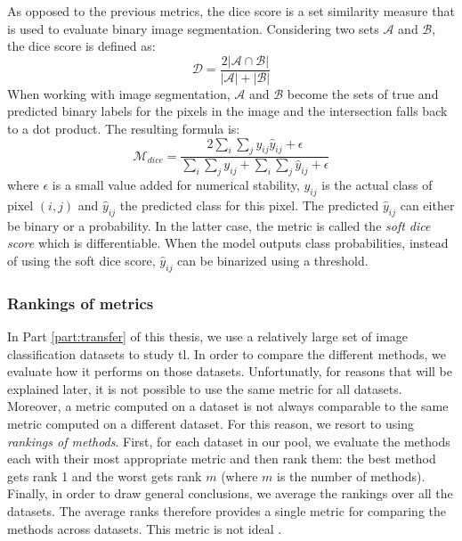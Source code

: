 As opposed to the previous metrics, the dice score is a set similarity measure that is used to evaluate binary image segmentation. Considering two sets $\mathcal{A}$ and $\mathcal{B}$, the dice score is defined as:
\begin{equation}
\label{eqn:backml:diceAB}
\mathcal{D} = \frac{2 \left|\mathcal{A}\cap \mathcal{B}\right|}{\left|\mathcal{A}\right| + \left|\mathcal{B}\right|}
\end{equation}
When working with image segmentation, $\mathcal{A}$ and $\mathcal{B}$ become the sets of true and predicted binary labels for the pixels in the image and the intersection falls back to a dot product. The resulting formula is:
\begin{equation}
\label{eqn:backml:dice}
\mathcal{M}_{dice} = \dfrac{2 \sum_i\sum_j y_{ij} \hat{y}_{ij} + \epsilon}{\sum_i\sum_j y_{ij} + \sum_i\sum_j \hat{y}_{ij} + \epsilon}
\end{equation}
where $\epsilon$ is a small value added for numerical stability, $y_{ij}$ is the actual class of pixel $(i, j)$ and $\hat{y}_{ij}$ the predicted class for this pixel. The predicted $\hat{y}_{ij}$ can either be binary or a probability. In the latter case, the metric is called the \textit{soft dice score} which is differentiable. When the model outputs class probabilities, instead of using the soft dice score, $\hat{y}_{ij}$ can be binarized using a threshold. 

\subsubsection{Rankings of metrics}
\label{ssec:backml:metric:rankings}

In Part \ref{part:transfer} of this thesis, we use a relatively large set of image classification datasets to study \acrlong{tl}. In order to compare the different methods, we evaluate how it performs on those datasets. Unfortunatly, for reasons that will be explained later, it is not possible to use the same metric for all datasets. Moreover, a metric computed on a dataset is not always comparable to the same metric computed on a different dataset. For this reason, we resort to using \textit{rankings of methods}. First, for each dataset in our pool, we evaluate the methods each with their most appropriate metric and then rank them: the best method gets rank 1 and the worst gets rank $m$ (where $m$ is the number of methods). Finally, in order to draw general conclusions, we average the rankings over all the datasets. The average ranks therefore provides a single metric for comparing the methods across datasets. This metric is not ideal .

